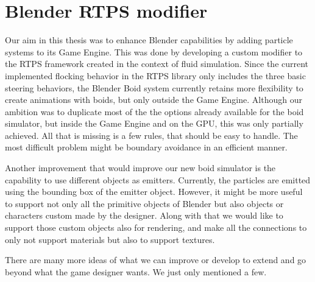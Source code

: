 \section{Blender RTPS modifier}
Our aim in this thesis was to enhance Blender capabilities by adding particle systems to its Game Engine. This was done by developing a custom modifier to the RTPS framework created in the context of fluid simulation. Since the current implemented flocking behavior in the RTPS library only includes the three basic steering behaviors, the Blender Boid system currently retains more flexibility to create animations with boids, but only outside the Game Engine.  Although our ambition was to duplicate most of the the options already available for the boid simulator, but inside the Game Engine and on the GPU, this was only partially achieved. All that is missing is a few rules, that should be easy to handle. The most difficult problem might be boundary avoidance in an efficient manner. 

Another improvement that would improve our new boid simulator is the capability to use different objects as emitters. Currently, the particles are emitted using the bounding box of the emitter object. However, it might be more useful to support not only all the primitive objects of Blender but also objects or characters custom made by the designer. Along with that we would like to support those custom objects also for rendering, and make all the connections to only not support materials but also to support textures.

There are many more ideas of what we can improve or develop to extend and go beyond what the game designer wants. We just only mentioned a few.

